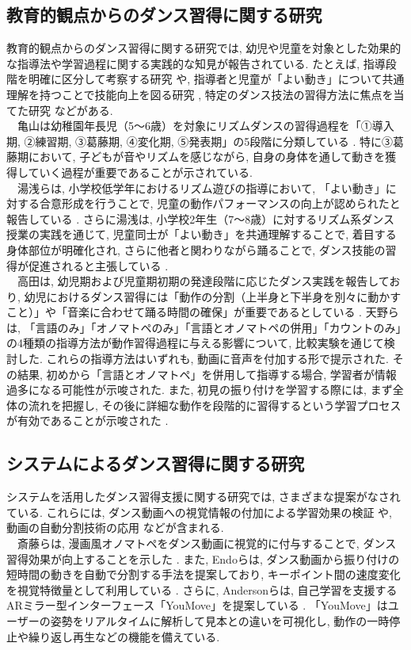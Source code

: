 \documentclass[technicalreport]{ieicej}
\begin{document}
\subsection{教育的観点からのダンス習得に関する研究}
教育的観点からのダンス習得に関する研究では, 幼児や児童を対象とした効果的な指導法や学習過程に関する実践的な知見が報告されている. たとえば, 指導段階を明確に区分して考察する研究 \cite{ref10}や, 指導者と児童が「よい動き」について共通理解を持つことで技能向上を図る研究 \cite{ref11}, 特定のダンス技法の習得方法に焦点を当てた研究 \cite{ref12}などがある.\\
　亀山は幼稚園年長児（5～6歳）を対象にリズムダンスの習得過程を「①導入期, ②練習期, ③葛藤期, ④変化期, ⑤発表期」の5段階に分類している \cite{ref10}. 特に③葛藤期において, 子どもが音やリズムを感じながら, 自身の身体を通して動きを獲得していく過程が重要であることが示されている.\\
　湯浅らは, 小学校低学年におけるリズム遊びの指導において, 「よい動き」に対する合意形成を行うことで, 児童の動作パフォーマンスの向上が認められたと報告している \cite{ref11}. さらに湯浅は, 小学校2年生（7～8歳）に対するリズム系ダンス授業の実践を通じて, 児童同士が「よい動き」を共通理解することで, 着目する身体部位が明確化され, さらに他者と関わりながら踊ることで, ダンス技能の習得が促進されると主張している \cite{ref12}.\\
　高田は, 幼児期および児童期初期の発達段階に応じたダンス実践を報告しており, 幼児におけるダンス習得には「動作の分割（上半身と下半身を別々に動かすこと）」や「音楽に合わせて踊る時間の確保」が重要であるとしている \cite{ref13}. 天野らは, 「言語のみ」「オノマトペのみ」「言語とオノマトペの併用」「カウントのみ」の4種類の指導方法が動作習得過程に与える影響について, 比較実験を通じて検討した. これらの指導方法はいずれも, 動画に音声を付加する形で提示された. その結果, 初めから「言語とオノマトペ」を併用して指導する場合, 学習者が情報過多になる可能性が示唆された. また, 初見の振り付けを学習する際には, まず全体の流れを把握し, その後に詳細な動作を段階的に習得するという学習プロセスが有効であることが示唆された \cite{ref14}. 
\subsection{システムによるダンス習得に関する研究}
システムを活用したダンス習得支援に関する研究では, さまざまな提案がなされている. これらには, ダンス動画への視覚情報の付加による学習効果の検証 \cite{ref15}や, 動画の自動分割技術の応用 \cite{ref16}などが含まれる. \\
　斎藤らは, 漫画風オノマトペをダンス動画に視覚的に付与することで, ダンス習得効果が向上することを示した \cite{ref15}. また, Endoらは, ダンス動画から振り付けの短時間の動きを自動で分割する手法を提案しており, キーポイント間の速度変化を視覚特徴量として利用している \cite{ref16}. さらに, Andersonらは, 自己学習を支援するARミラー型インターフェース「YouMove」を提案している \cite{ref22}. 「YouMove」はユーザーの姿勢をリアルタイムに解析して見本との違いを可視化し, 動作の一時停止や繰り返し再生などの機能を備えている. 
\end{document}
